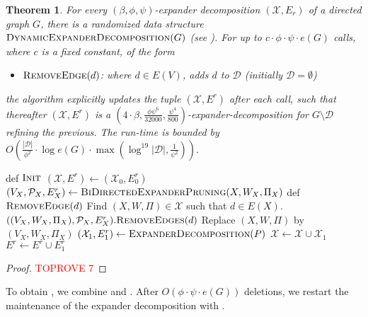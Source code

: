 \documentclass[11pt]{article}
\newtheorem{theorem}{Theorem}[section]
\begin{document}
\begin{theorem}\label{thm:DED}For every $(\beta, \phi, \psi)$-expander decomposition $(\mathcal{X}, E_r)$ of a directed graph $G$, there is a randomized data structure $\textsc{DynamicExpanderDecomposition}(G)$ (see ). For up to $c \cdot \phi \cdot \psi \cdot e(G)$ calls, where $c$ is a fixed constant, of the form
\begin{itemize}
    \item $\textsc{RemoveEdge}(d)$: where $d \in E(V)$, adds $d$ to $\mathcal{D}$ (initially $\mathcal{D} = \emptyset$)
\end{itemize}
the algorithm explicitly updates the tuple $(\mathcal{X}, E^r)$ after each call, such that thereafter $(\mathcal{X}, E^r)$ is a $\left(4 \cdot \beta, \frac{\phi \psi^6}{32000}, \frac{\psi^4}{800}\right)$-expander-decomposition for $G \setminus \mathcal{D}$ refining the previous. The run-time is bounded by $O\left(\frac{|\mathcal{D}|}{\phi^2} \cdot \log e(G) \cdot \max\left(\log^{19}|\mathcal{D}|, \frac{1}{\psi^2}\right)\right).$
\end{theorem}

\begin{algorithm}[H]
    \begin{algorithmic}[1]
    \caption{$\textsc{DynamicExpanderDecomposition}(\mathcal{X}_0, E^r_0)$}\label{alg:DynamicExpanderDecomposition}
    \State def $\textsc{Init}$
    \Indent
    \State $(\mathcal{X}, E^r) \leftarrow (\mathcal{X}_0, E^r_0)$
    \State $(V_X, \mathcal{P}_X, E^r_X) \leftarrow \textsc{BiDirectedExpanderPruning}(X, W_X, \Pi_X)$
    \EndFor
    \EndIndent
    \State 
    \State def $\textsc{RemoveEdge}(d)$
    \Indent
    \State Find $(X, W, \Pi) \in \mathcal{X}$ such that $d \in E(X)$.
    \State $((V_X, W_X, \Pi_X), \mathcal{P}_X,E^r_X).\textsc{RemoveEdges}(d)$
    \State Replace $(X, W, \Pi)$ by $(V_X, W_X, \Pi_X)$
    \State $(\mathcal{X}_1, E^r_1) \leftarrow \textsc{ExpanderDecomposition}(P)$ \label{alg:DynExpDec-line12}
    \State $\mathcal{X} \leftarrow \mathcal{X} \cup \mathcal{X}_1$
    \State $E^r \leftarrow E^r \cup E^r_1$
    \EndFor
    \EndIndent
    \end{algorithmic}
\end{algorithm}

\begin{proof}\textcolor{red}{TOPROVE 7}\end{proof}

To obtain , we combine  and . After $O(\phi \cdot \psi \cdot e(G))$ deletions, we restart the maintenance of the expander decomposition with .

 
\end{document}
